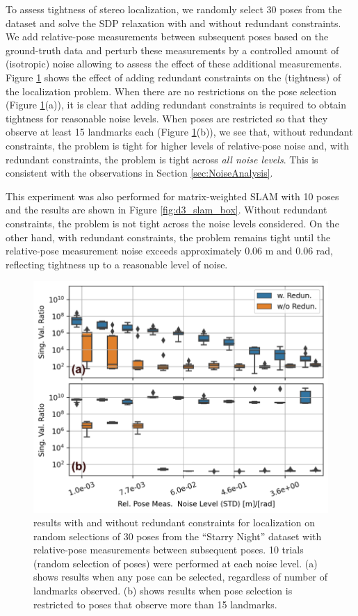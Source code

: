 \documentclass[lettersize,journal]{IEEEtran}
\newcommand{\rev}[1]{\color{red}{#1}\color{black}}
\begin{document}
To assess tightness of stereo localization, we randomly select 30 poses from the dataset and solve the SDP relaxation with and without redundant constraints. We add relative-pose measurements between subsequent poses based on the ground-truth data and perturb these measurements by a controlled amount of (isotropic) noise allowing to assess the effect of these additional measurements. Figure \ref{fig:d3_loc_box} shows the effect of adding redundant constraints on the \rev{ER } (tightness) of the localization problem. When there are no restrictions on the pose selection (Figure \ref{fig:d3_loc_box}(a)), it is clear that adding redundant constraints is required to obtain tightness for reasonable noise levels. When poses are restricted so that they observe at least 15 landmarks each (Figure \ref{fig:d3_loc_box}(b)), we see that, without redundant constraints, the problem is tight for higher levels of relative-pose noise and, with redundant constraints, the problem is tight across \emph{all noise levels}. This is consistent with the observations in Section \ref{sec:NoiseAnalysis}.

This experiment was also performed for matrix-weighted SLAM with 10 poses and the results are shown in Figure \ref{fig:d3_slam_box}. Without redundant constraints, the problem is not tight across the noise levels considered. On the other hand, with redundant constraints, the problem remains tight until the relative-pose measurement noise exceeds approximately 0.06 m and 0.06 rad, reflecting tightness up to a reasonable level of noise.  

\begin{figure}[!b]
	\centering
	\includegraphics[width=\columnwidth]{figs/loc_box_plots}
	\caption{\rev{ER } results with and without redundant constraints for localization on random selections of 30 poses from the ``Starry Night'' dataset with relative-pose measurements between subsequent poses. 10 trials (random selection of poses) were performed at each noise level. (a) shows results when any pose can be selected, regardless of number of landmarks observed. (b) shows results when pose selection is restricted to poses that observe more than 15 landmarks.}
	\label{fig:d3_loc_box}
\end{figure}
\end{document}

